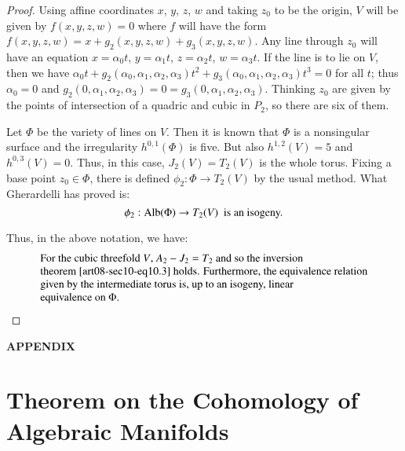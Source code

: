 \begin{proof}
Using affine coordinates $x$, $y$, $z$, $w$ and taking $z_{0}$ to be the origin, $V$ will be given by $f(x,y,z,w)=0$ where $f$ will have the form $f(x,y,z,w)=x+g_{2}(x,y,z,w)+g_{3}(x,y,z,w)$. Any line through $z_{0}$ will have an equation $x=\alpha_{0}t$, $y=\alpha_{1}t$, $z=\alpha_{2}t$, $w=\alpha_{3}t$. If the line is to lie on $V$, then we have $\alpha_{0}t+g_{2}(\alpha_{0},\alpha_{1},\alpha_{2},\alpha_{3})t^{2}+g_{3}(\alpha_{0},\alpha_{1},\alpha_{2},\alpha_{3})t^{3}=0$ for all $t$; thus $\alpha_{0}=0$ and $g_{2}(0,\alpha_{1},\alpha_{2},\alpha_{3})=0=g_{3}(0,\alpha_{1},\alpha_{2},\alpha_{3})$. Thinking $z_{0}$ are given by the points of intersection of a quadric and cubic in $P_{2}$, so there are six of them.

Let $\Phi$ be the variety of lines on $V$. Then it is known that $\Phi$ is a nonsingular surface and the irregularity $h^{0,1}(\Phi)$ is five. But also $h^{1,2}(V)=5$ and $h^{0,3}(V)=0$. Thus, in this case, $J_{2}(V)=T_{2}(V)$ is the whole torus. Fixing a base point $z_{0}\in \Phi$, there is defined $\phi_{2}:\Phi\to T_{2}(V)$ by the usual method. What Gherardelli has proved is:
\begin{equation}
\phi_{2}:\operatorname{\mathrm{Alb}}(\Phi)\to T_{2}(V)\text{~ is an isogeny.}\label{art08-sec10-eq10.19}
\end{equation}

Thus, in the above notation, we have:
\begin{equation}
\begin{array}{l}
\text{For the cubic threefold $V$, $A_{2}-J_{2}=T_{2}$ and so the inversion}\\
\text{theorem \eqref{art08-sec10-eq10.3} holds. Furthermore, the equivalence relation}\\
\text{given by the intermediate torus is, up to an isogeny, linear}\\
\text{equivalence on $\Phi$.}
\end{array}\label{art08-sec10-eq10.20}
\end{equation}
\end{proof}


\newpage

\appendix

\begin{center}
{\Large\bf APPENDIX}
\end{center}

\section{Theorem on the Cohomology of Algebraic Manifolds}\label{art08-app-A}

